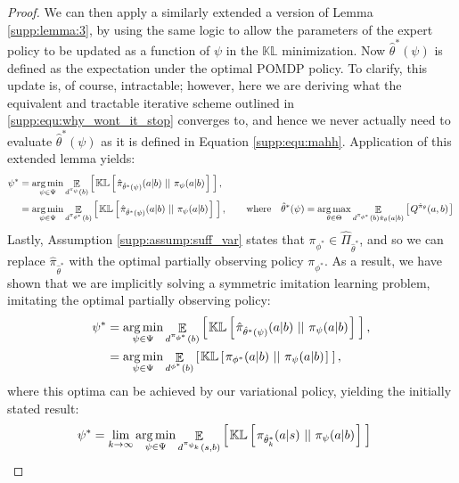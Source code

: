 \begin{proof}
We can then apply a similarly extended a version of Lemma \ref{supp:lemma:3}, by using the same logic to allow the parameters of the expert policy to be updated as a function of $\psi$ in the $\mathbb{KL}$ minimization.  Now $\hat{\theta}^*(\psi)$ is defined as the expectation under the optimal POMDP policy.  To clarify, this update is, of course, intractable; however, here we are deriving what the equivalent and tractable iterative scheme outlined in \eqref{supp:equ:why_wont_it_stop} converges to, and hence we never actually need to evaluate $\hat{\theta}^*(\psi)$ as it is defined in Equation \eqref{supp:equ:mahh}.  Application of this extended lemma yields:
\begin{align}
    \psi^* &= \mathop{\operatorname{arg\,min}}_{\psi \in \Psi}  \mathop{\mathbb{E}}_{d^{\pi_{\psi}}(b)}  \left[ \hspace*{0.1em}{}  \mathbb{KL} \left[ \hspace*{0.1em}{}  \hat{\pi}_{\hat{\theta}^*(\psi)}(a|b) \ ||\ {} \pi_\psi(a|b) \hspace*{0.1em} \right]{}  \hspace*{0.1em} \right]{} , 
    \\
    &= \mathop{\operatorname{arg\,min}}_{\psi \in \Psi}  \mathop{\mathbb{E}}_{d^{\pi_{\phi^*}}(b)}  \left[ \hspace*{0.1em}{}  \mathbb{KL} \left[ \hspace*{0.1em}{}  \hat{\pi}_{\hat{\theta}^*(\psi)}(a|b)\ ||\ {} \pi_\psi(a|b) \hspace*{0.1em} \right]{}  \hspace*{0.1em} \right]{} , \ \ \  \quad \text{where }\ \   \hat{\theta}^*(\psi) = \mathop{\operatorname{arg\,max}}_{\theta \in \Theta} \mathop{\mathbb{E}}_{d^{{\pi_{\phi^*}}}(b) \hat{\pi}_{\theta}(a | b)} \left[ \hspace*{0.1em}{} Q^{{\hat{\pi}_{\theta}}}(a,b) \hspace*{0.1em} \right]{}
\end{align}
Lastly, Assumption \ref{supp:assump:suff_var} states that $\pi_{\phi^*} \in \hat{\Pi}_{\hat{\theta}^*}$, and so we can replace $\hat{\pi}_{\hat{\theta}^*}$ with the optimal partially observing policy ${\pi_{\phi^*}}$.  As a result, we have shown that we are implicitly solving a symmetric imitation learning problem, imitating the optimal partially observing policy:
\begin{align}
    \psi^* &= \mathop{\operatorname{arg\,min}}_{\psi \in \Psi}  \mathop{\mathbb{E}}_{d^{\pi_{\phi^*}}(b)}  \left[ \hspace*{0.1em}{}  \mathbb{KL} \left[ \hspace*{0.1em}{}  \hat{\pi}_{\hat{\theta}^*(\psi)}(a|b) \ ||\ {} \pi_{\psi}(a|b) \hspace*{0.1em} \right]{}  \hspace*{0.1em} \right]{} , 
    \\
    &= \mathop{\operatorname{arg\,min}}_{\psi \in \Psi}  \mathop{\mathbb{E}}_{d^{\phi^*}(b)}  \left[ \hspace*{0.1em}{}  \mathbb{KL} \left[ \hspace*{0.1em}{}  \pi_{\phi^*}(a|b)\ ||\ {} \pi_\psi(a|b) \hspace*{0.1em} \right]{} \hspace*{0.1em} \right]{} ,
\end{align}
where this optima can be achieved by our variational policy, yielding the initially stated result:
\begin{align}
    \psi^* &= \lim_{k \rightarrow \infty} \mathop{\argmin}_{\psi \in \Psi}  \mathop{\mathbb{E}}_{d^{\pi_{\psi_k}}(s,b)}  \lspsqb{}  \mathbb{KL} \lspsqb{}  \pi_{\hat{\theta}_k^*}(a|s) \klbars{} \pi_\psi(a|b) \rspsqb{}  \rspsqb{}

\end{align}
\end{proof}
